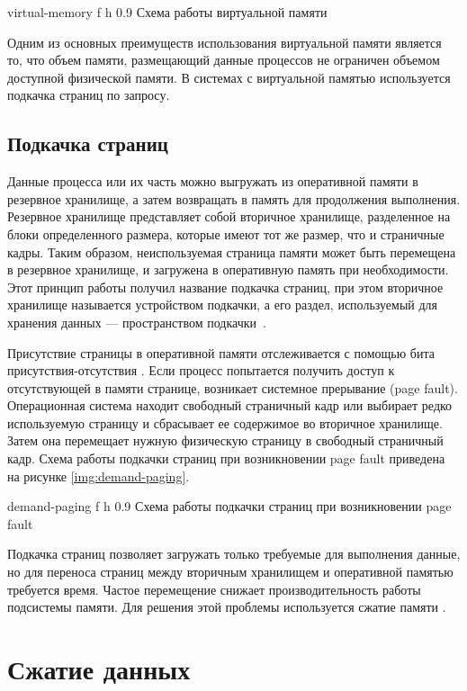     {virtual-memory}
    {f}
    {h}
    {0.9\textwidth}
    {Схема работы виртуальной памяти}
    
Одним из основных преимуществ использования виртуальной памяти является то, что объем памяти, размещающий данные процессов не ограничен объемом доступной физической памяти. В системах с виртуальной памятью используется подкачка страниц по запросу.

\subsection{Подкачка страниц}

Данные процесса или их часть можно выгружать из оперативной памяти в резервное хранилище, а затем возвращать в память для продолжения выполнения. Резервное хранилище представляет собой вторичное хранилище, разделенное на блоки определенного размера, которые имеют тот же размер, что и страничные кадры. Таким образом, неиспользуемая страница памяти может быть перемещена в резервное хранилище, и загружена в оперативную память при необходимости. Этот принцип работы получил название подкачка страниц, при этом вторичное хранилище называется устройством подкачки, а его раздел, используемый для хранения данных --- пространством подкачки~\cite{swapping}.

Присутствие страницы в оперативной памяти отслеживается с помощью бита присутствия-отсутствия \cite{address-space}. Если процесс попытается получить доступ к отсутствующей в памяти странице, возникает системное прерывание (page fault). Операционная система находит свободный страничный кадр или выбирает редко используемую страницу и сбрасывает ее содержимое во вторичное хранилище. Затем она перемещает нужную физическую страницу в свободный страничный кадр. Схема работы подкачки страниц при возникновении page fault приведена на рисунке \ref{img:demand-paging}.

    {demand-paging}
    {f}
    {h}
    {0.9\textwidth}
    {Схема работы подкачки страниц при возникновении page fault}
    
Подкачка страниц позволяет загружать только требуемые для выполнения данные, но для переноса страниц между вторичным хранилищем и оперативной памятью требуется время. Частое перемещение снижает производительность работы подсистемы памяти. Для решения этой проблемы используется сжатие памяти \cite{swapping-problem}.

\section{Сжатие данных}\label{compression}

